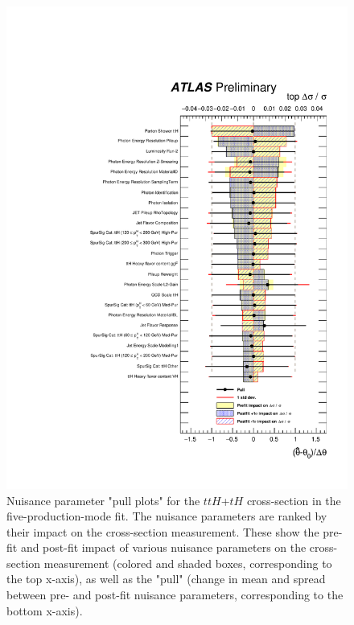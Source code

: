 \begin{figure}[htbp]
  \centering
  \includegraphics[width=0.9\linewidth]{figures/couplings_chapter/pulls_mu_top}
  \caption{Nuisance parameter "pull plots" for the $ttH$+$tH$ cross-section in the five-production-mode fit. The nuisance parameters are ranked by their impact on the cross-section measurement. These show the pre-fit and post-fit impact of various nuisance parameters on the cross-section measurement (colored and shaded boxes, corresponding to the top x-axis), as well as the "pull" (change in mean and spread between pre- and post-fit nuisance parameters, corresponding to the bottom x-axis).}
  \label{fig:ranking_top}
\end{figure}
